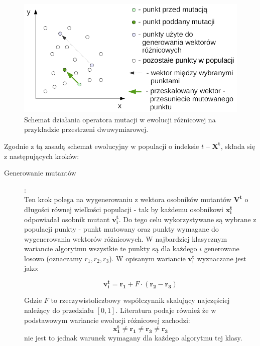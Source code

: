 \documentclass[12pt,a4paper]{report}
\begin{document}
{{%
\begin{figure}[h]
\begin{center}\includegraphics[scale=0.8]{img/BasicMutationSchema.png}\end{center}
\caption{Schemat działania operatora mutacji w ewolucji różnicowej na przykładzie przestrzeni dwuwymiarowej.}
\label{DEvolMutationBasic}
\end{figure}


\par{
Zgodnie z tą zasadą schemat ewolucyjny w populacji o indeksie ${t}$ -- $\mathbf{X^t}$, składa się z następujących kroków:
}

\par{
	\begin{description}
	
	
  		\item[Generowanie mutantów]:\\
  Ten krok polega na wygenerowaniu z wektora osobników mutantów $\mathbf{V^{t}}$ o długości równej wielkości populacji - tak by każdemu osobnikowi $\mathbf{x_i^{t}}$ odpowiadał osobnik mutant $\mathbf{v_i^{t}}$.
  Do tego celu wykorzystywane są wybrane z populacji punkty - punkt mutowany oraz punkty wymagane do wygenerowania wektorów różnicowych. W najbardziej klasycznym wariancie algorytmu wszystkie te punkty są dla każdego $i$ generowane losowo \cite{SpringerIntroToEvol} (oznaczamy $r_1, r_2, r_3$).
  W opisanym wariancie $\mathbf{v_i^{t}}$ wyznaczane jest jako:

\begin{equation} \label{eq:DiffMutation}
 \mathbf{v_i^{t}} = \mathbf{r_1} + F \cdot (\mathbf{r_2} - \mathbf{r_3})
\end{equation}

Gdzie $F$ to rzeczywistoliczbowy współczynnik skalujący najczęściej należący do przedziału $[0, 1]$. Literatura \cite{SpringerIntroToEvol} podaje również że w podstawowym wariancie ewolucji różnicowej zachodzi:
\begin{equation}
\mathbf{x_1^{t}} \neq \mathbf{r_1} \neq \mathbf{r_3} \neq \mathbf{r_3}
\end{equation}
nie jest to jednak warunek wymagany dla każdego algorytmu tej klasy.



\end{description}}}}
\end{document}
